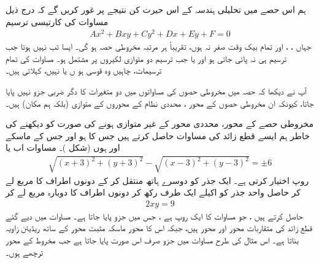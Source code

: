 

ہم اس حصے میں تحلیلی ہندسہ  کے اس حیرت کن نتیجے پر غور کریں گے کہ درج ذیل مساوات کی کارتیسی ترسیم
\begin{align}\label{مساوات_مخروط_مخروطی_حصہ_عمومی_مساوات_الف}
Ax^2+Bxy+Cy^2+Dx+Ey+F=0
\end{align}
جہاں ، ،  اور    تمام بیک وقت  صفر نہ ہوں، تقریباً ہر  مرتبہ  مخروطی حصہ ہو گی۔ ایسا تب نہیں ہوتا جب  ترسیم ہی نہ پائی جاتی ہو اور   یا جب ترسیم دو متوازی لکیروں پر مشتمل ہو۔ مساوات  کی تمام ترسیمات، چاہیں وہ قوسی ہو ں یا نہیں،  کہلاتی ہیں۔

آپ نے دیکھا کہ حصہ  میں مخروطی حصوں کی مساواتوں میں دو متغیرات کا  دگر   ضربی  جزو  نہیں پایا جاتا، کیونکہ ان مخروطی حصوں  کے محور  ، محددی نظام کے محوروں  کے متوازی (بلکہ ہم مکان) ہیں۔ 

مخروطی حصے کے محور، محددی محور  کے غیر متوازی ہونے کی صورت کو دیکھنے کی خاطر ہم ایسے  قطع زائد کی مساوات حاصل کرتے ہیں جس کا  ہو اور جس کے ماسکے  اور  ہوں (شکل )۔ مساوات  اب  یا
\begin{align*}
\sqrt{(x+3)^2+(y+3)^2}-\sqrt{(x-3)^2+(y-3)^2}=\pm 6
\end{align*}
روپ اختیار کرتی ہے۔ ایک جذر کو دوسرے ہاتھ منتقل کر کے دونوں اطراف کا مربع لے کر حاصل واحد جذر کو  اکیلے ایک طرف رکھ کر دونوں اطراف کا  دوبارہ مربع لے کر
\begin{align}\label{مساوات_مخروط_قطع_زائد_ب}
2xy=9
\end{align}
حاصل کرتے ہیں ، جو مساوات  کا ایک روپ ہے ، جس میں جزو  پایا جاتا ہے۔ مساوات  میں دیے گئے قطع زائد کی  متقاربات   محور  اور محور  ہیں، جبکہ اس کا  محور ماسکہ مثبت محور  کے ساتھ  ریڈیئن زاویہ بناتا ہے۔ اس مثال کی طرح مساوات  میں جزو  صرف اس صورت پایا جاتا ہے جب مخروط کے محور ترچھے ہوں۔


